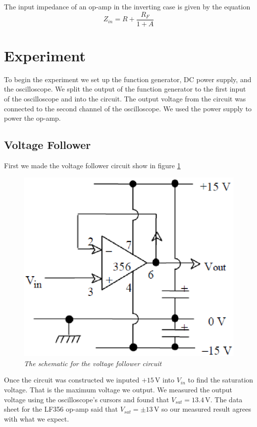 \documentclass[11pt]{article}
\numberwithin{equation}{section}
\numberwithin{figure}{section}
\numberwithin{table}{section}
\newcommand{\unit}[1]{\ensuremath{\, \mathrm{#1}}}
\begin{document}
The input impedance of an op-amp in the inverting case is given by the equation 
\begin{equation}
Z_{in} = R+\frac{R_F}{1+A}
\label{InputImp}
\end{equation}

\section{Experiment}
To begin the experiment we set up the function generator, DC power supply, and the oscilloscope. We split the output of the function generator to the first input of the oscilloscope and into the circuit. The output voltage from the circuit was connected to the second channel of the oscilloscope. We used the power supply to power the op-amp. 

\subsection{Voltage Follower} 
First we made the voltage follower circuit show in figure \ref{FigVoltFollow}

\begin{figure}[h]
\centering
\includegraphics[scale=0.60]{FigVoltFollow.eps}
\caption{\textit{The schematic for the voltage follower circuit}}
\label{FigVoltFollow}
\end{figure}
Once the circuit was constructed we inputed $+15\unit{V}$ into $V_{in}$ to find the saturation voltage. That is the maximum voltage we output. We measured the output voltage using the oscilloscope's cursors and found that $V_{sat} = 13.4\unit{V}$. The data sheet for the LF356 op-amp said that $V_{sat} = \pm13\unit{V}$ so our measured result agrees with what we expect.
\end{document}
